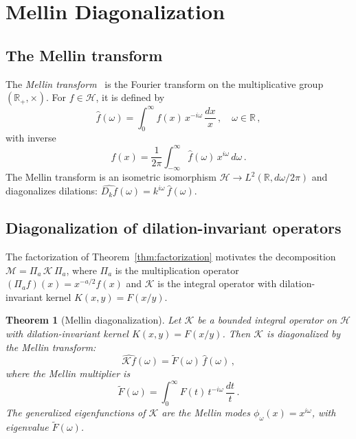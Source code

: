 \documentclass[12pt]{article}
\newtheorem{theorem}{Theorem}
\begin{document}
\section{Mellin Diagonalization}\label{sec:mellin}

\subsection{The Mellin transform}

The \emph{Mellin transform}~\cite{Titchmarsh1986,ReedSimon1978} is the Fourier transform on the multiplicative group $(\mathbb{R}_+, \times)$. For $f \in \mathcal{H}$, it is defined by
\begin{equation}\label{eq:mellindef}
\hat{f}(\omega) = \int_0^\infty f(x)\, x^{-i\omega}\, \frac{dx}{x}\,, \quad \omega \in \mathbb{R}\,,
\end{equation}
with inverse
\begin{equation}\label{eq:mellininv}
f(x) = \frac{1}{2\pi} \int_{-\infty}^\infty \hat{f}(\omega)\, x^{i\omega}\, d\omega\,.
\end{equation}
The Mellin transform is an isometric isomorphism $\mathcal{H} \to L^2(\mathbb{R}, d\omega/2\pi)$ and diagonalizes dilations: $\widehat{D_k f}(\omega) = k^{i\omega}\, \hat{f}(\omega)$.


\subsection{Diagonalization of dilation-invariant operators}

The factorization of Theorem~\ref{thm:factorization} motivates the decomposition $\mathcal{M} = \Pi_a \,\mathcal{K}\, \Pi_a$, where $\Pi_a$ is the multiplication operator $(\Pi_a f)(x) = x^{-a/2} f(x)$ and $\mathcal{K}$ is the integral operator with dilation-invariant kernel $K(x,y) = F(x/y)$.

\begin{theorem}[Mellin diagonalization]\label{thm:mellin}
Let $\mathcal{K}$ be a bounded integral operator on $\mathcal{H}$ with dilation-invariant kernel $K(x,y) = F(x/y)$. Then $\mathcal{K}$ is diagonalized by the Mellin transform:
\begin{equation}\label{eq:mellindiag}
\widehat{\mathcal{K} f}(\omega) = \widetilde{F}(\omega)\, \hat{f}(\omega)\,,
\end{equation}
where the \emph{Mellin multiplier} is
\begin{equation}\label{eq:multiplier}
\widetilde{F}(\omega) = \int_0^\infty F(t)\, t^{-i\omega}\, \frac{dt}{t}\,.
\end{equation}
The generalized eigenfunctions of $\mathcal{K}$ are the \emph{Mellin modes} $\phi_\omega(x) = x^{i\omega}$, with eigenvalue $\widetilde{F}(\omega)$.
\end{theorem}
\end{document}
